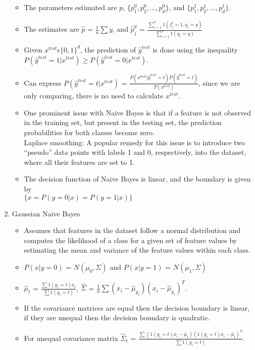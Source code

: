 \documentclass[a4paper]{article}
\begin{document}
\begin{enumerate}
\begin{itemize}
        \item The parameters estimated are $p$, $\{p_1^0,p_2^0,...,p_d^0\}$, and $\{p_1^1,p_2^1,...,p_d^1\}$.
        \item The estimates are $\hat{p}$ = $\frac{1}{n}\sum y$, and $\hat{p}^y_j$ = $\frac{\sum_{i=1}^n 1(f_j^i=1,y_i=y)}{\sum_{i=1}^n 1(y_i=y)}$
        \item Given $x^{test}\epsilon\{0,1\}^d$, the prediction of $\hat{y}^{test}$ is done using the inequality $P(\hat{y}^{test}=1|x^{test})\geq P(\hat{y}^{test}=0|x^{test})$.
        \item Can express $P(\hat{y}^{test}=t|x^{test})$ = $\frac{P(x^{test}|\hat{y}^{test}=t)P(\hat{y}^{test}=t)}{P({x}^{test})}$, since we are only comparing, there is no need to calculate $x^{test}$.
        \item One prominent issue with Naive Bayes is that if a feature is not observed in the training set, but present in the testing set, the prediction probabilities for both classes become zero.\\
        Laplace smoothing: A popular remedy for this issue is to introduce two “pseudo” data points with labels 1 and 0, respectively, into the dataset, where all their features are set to 1.
        \item The decision function of Naive Bayes is linear, and the boundary is given by\\
        $\{x = P(y=0|x) = P(y=1| x)\}$
    \end{itemize}
    \item Gaussian Naive Bayes
    \begin{itemize}
        \item Assumes that features in the dataset follow a normal distribution and computes the likelihood of a class for a given set of feature values by estimating the mean and variance of the feature values within each class.
        \item $P(x|y=0)$ = $N(\mu_0,\Sigma)$ and $P(x|y=1)$ = $N(\mu_1,\Sigma)$
        \item $\hat{\mu}_t$ = $\frac{\sum1(y_i=t)x_i}{\sum1(y_i=t)}$, $\hat{\Sigma}$ = $\frac{1}{n}\sum(x_i - \hat{\mu}_{y_i})(x_i - \hat{\mu}_{y_i})^T$.
        \item If the covariance matrices are equal then the decision boundary is linear, if they are unequal then the decision boundary is quadratic.
        \item For unequal covariance matrix $\hat{\Sigma}_t$ = $\frac{\sum(1(y_i=t)x_i - \hat{\mu}_{t})(1(y_i=t)x_i - \hat{\mu}_{t})^T}{\sum1(y_i=t)}$.
    \end{itemize}
\end{enumerate}
\end{document}
